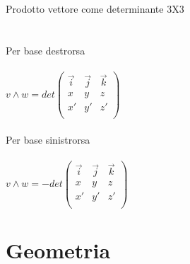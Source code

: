 \documentclass{article}
\begin{document}
{\large Prodotto vettore come determinante 3X3}\\\\\\
Per base destrorsa\\\\
\(v\wedge w = det\left(
\begin{array}{ccc}
    \vec{i} & \vec{j} & \vec{k}\\
    x       & y       & z      \\
    x'      & y'      & z'     \\
\end{array}
\right)\)\\\\
Per base sinistrorsa\\\\
\(v\wedge w = -det\left(
\begin{array}{ccc}
    \vec{i} & \vec{j} & \vec{k}\\
    x       & y       & z      \\
    x'      & y'      & z'     \\
\end{array}
\right)\)\\

\section{Geometria}
\end{document}
